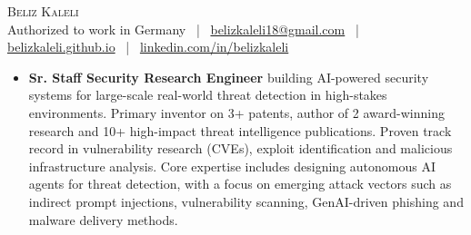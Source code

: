 \documentclass[letterpaper,11pt]{article}
\begin{document}

\begin{center}
    {\Huge \scshape Beliz Kaleli} \\ \vspace{2pt}
    \small
    Authorized to work in Germany ~|~
    \href{mailto:belizkaleli18@gmail.com}{belizkaleli18@gmail.com} ~|~
    \href{https://belizkaleli.github.io}{belizkaleli.github.io} ~|~
    \href{https://linkedin.com/in/belizkaleli}{linkedin.com/in/belizkaleli}
    \vspace{-20pt}
\end{center}

\vspace{2pt}
\begin{itemize}[leftmargin=0.0in, label={}]
  \item \small \textbf{Sr. Staff Security Research Engineer} building AI-powered security systems for large-scale real-world threat detection in high-stakes environments. Primary inventor on 3+ patents, author of 2 award-winning research and 10+ high-impact threat intelligence publications. Proven track record in vulnerability research (CVEs), exploit identification and malicious infrastructure analysis. Core expertise includes designing autonomous AI agents for threat detection, with a focus on emerging attack vectors such as indirect prompt injections, vulnerability scanning, GenAI-driven phishing and malware delivery methods.

\end{itemize}
\vspace{-16pt}

\end{document}
